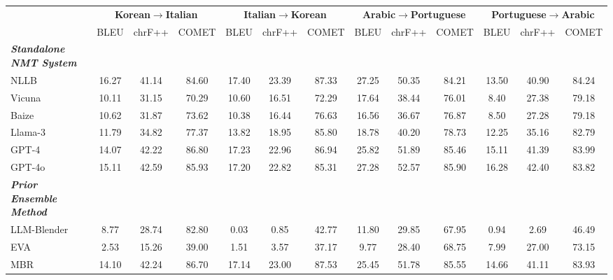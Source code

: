 \begin{table*}[t]
\centering
\renewcommand{\arraystretch}{0.9}
\begin{adjustbox}{width=0.95\textwidth, center}
\begin{tabular}{lcccccccccccc}
\Xhline{3\arrayrulewidth}

\multirow{2}{*}{\textbf{Model}}  & \multicolumn{3}{c}{\textbf{Korean$\rightarrow$Italian}} & \multicolumn{3}{c}{\textbf{Italian$\rightarrow$Korean}} & \multicolumn{3}{c}{\textbf{Arabic$\rightarrow$Portuguese}} & \multicolumn{3}{c}{\textbf{Portuguese$\rightarrow$Arabic}}\\ \cline{2-13}
 & BLEU & chrF++ & COMET & BLEU & chrF++ & COMET  & BLEU & chrF++ & COMET & BLEU & chrF++ & COMET \\ \hline\hline 

\textit{\textbf{Standalone NMT System}}\\ \hdashline[3pt/3pt]
NLLB~\cite{nllb} & 16.27 & 41.14 & 84.60 &            17.40 &           23.39 &           87.33 &           27.25 &           50.35 &           84.21 &            13.50 &            40.90 &           84.24 \\
Vicuna~\cite{Vicuna} &10.11  & 31.15 & 70.29 & 10.60 & 16.51 & 72.29 & 17.64 & 38.44 & 76.01 & 8.40 &  27.38& 79.18 \\
Baize~\cite{baize} & 10.62 & 31.87 & 73.62 & 10.38 & 16.44 & 76.63 & 16.56 & 36.67 & 76.87 & 8.50 &27.28 & 79.18   \\
Llama-3~\cite{llama3modelcard} & 11.79 & 34.82 & 77.37 & 13.82 & 18.95 & 85.80 & 18.78 & 40.20 & 78.73 & 12.25 & 35.16 & 82.79 \\
GPT-4~\cite{gpt4}         &          14.07 &           42.22 &            86.80 &           17.23 &           22.96 &           86.94 &           25.82 &           51.89 &           85.46 &           15.11 &           41.39 &           83.99 \\ 
GPT-4o~\cite{gpt4o} & 15.11 & 42.59 & 85.93 & 17.20 &  22.82 & 85.31 & 27.28 & 52.57 & 85.90 & 16.28 & 42.40 & 83.82 \\
\hline




\textit{\textbf{Prior Ensemble Method}}\\ \hdashline[3pt/3pt]
LLM-Blender~\cite{llm-blender} & 8.77 & 28.74 & 82.80 & 0.03 & 0.85 & 42.77 & 11.80 & 29.85 & 67.95 & 0.94 & 2.69 & 46.49 \\
EVA~\cite{eva} & 2.53 & 15.26 & 39.00 &1.51 & 3.57 &  37.17 & 9.77 &  28.40 &  68.75 & 7.99 & 27.00 & 73.15 \\
MBR~\cite{mbr} & 14.10 & 42.24 & 86.70 & 17.14 & 23.00 & 87.53 & 25.45 & 51.78 & 85.55 & 14.66 & 41.11 & 83.93 \\ \hline



\end{tabular}
\end{adjustbox}
\end{table*}
